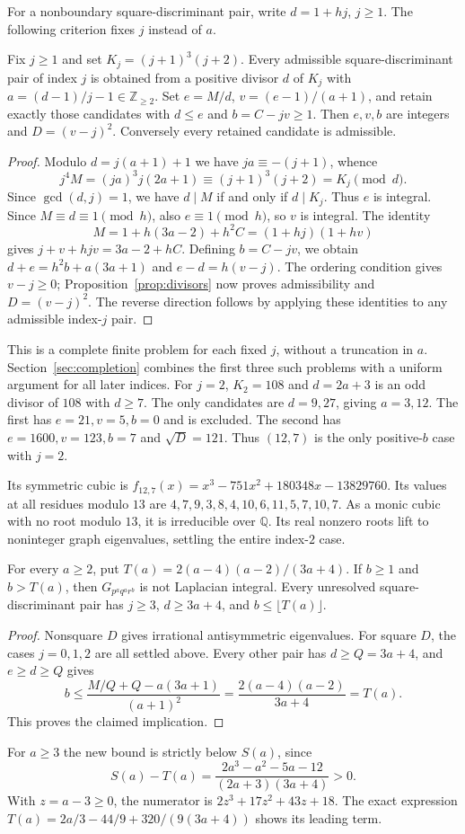 For a nonboundary square-discriminant pair, write $d=1+hj$, $j\geq1$.
The following criterion fixes $j$ instead of $a$.

\begin{proposition}
\label{prop:index}
Fix $j\geq1$ and set $K_j=(j+1)^3(j+2)$.
Every admissible square-discriminant pair of index $j$ is obtained from
a positive divisor $d$ of $K_j$ with
$a=(d-1)/j-1\in\mathbb Z_{\geq2}$.
Set $e=M/d$, $v=(e-1)/(a+1)$, and retain exactly those candidates with
$d\leq e$ and $b=C-jv\geq1$. Then $e,v,b$ are integers and
$D=(v-j)^2$. Conversely every retained candidate is admissible.
\end{proposition}
\begin{proof}
Modulo $d=j(a+1)+1$ we have $ja\equiv-(j+1)$, whence
\[
j^4M=(ja)^3j(2a+1)\equiv(j+1)^3(j+2)=K_j\pmod d.
\]
Since $\gcd(d,j)=1$, we have $d\mid M$ if and only if $d\mid K_j$.
Thus $e$ is integral. Since $M\equiv d\equiv1\pmod h$, also
$e\equiv1\pmod h$, so $v$ is integral. The identity
\[
M=1+h(3a-2)+h^2C=(1+hj)(1+hv)
\]
gives $j+v+h jv=3a-2+hC$. Defining $b=C-jv$, we obtain
$d+e=h^2b+a(3a+1)$ and $e-d=h(v-j)$.
The ordering condition gives $v-j\geq0$; Proposition~\ref{prop:divisors}
now proves admissibility and $D=(v-j)^2$. The reverse direction follows
by applying these identities to any admissible index-$j$ pair.
\end{proof}

This is a complete finite problem for each fixed $j$, without a
truncation in $a$. Section~\ref{sec:completion} combines the first
three such problems with a uniform argument for all later indices.
For $j=2$, $K_2=108$ and $d=2a+3$ is an odd divisor of $108$ with
$d\geq7$. The only candidates are $d=9,27$, giving $a=3,12$.
The first has $e=21,v=5,b=0$ and is excluded. The second has
$e=1600,v=123,b=7$ and $\sqrt D=121$.
Thus $(12,7)$ is the only positive-$b$ case with $j=2$.

Its symmetric cubic is $f_{12,7}(x)=x^3-751x^2+180348x-13829760$.
Its values at all residues modulo $13$ are
$4,7,9,3,8,4,10,6,11,5,7,10,7$.
As a monic cubic with no root modulo $13$, it is irreducible over
$\mathbb Q$. Its real nonzero roots lift to noninteger graph eigenvalues,
settling the entire index-$2$ case.

\begin{theorem}
\label{thm:third}
For every $a\geq2$, put $T(a)=2(a-4)(a-2)/(3a+4)$.
If $b\geq1$ and $b>T(a)$, then $G_{p^a q^a r^b}$ is not Laplacian
integral. Every unresolved square-discriminant pair has $j\geq3$,
$d\geq3a+4$, and $b\leq\lfloor T(a)\rfloor$.
\end{theorem}
\begin{proof}
Nonsquare $D$ gives irrational antisymmetric eigenvalues.
For square $D$, the cases $j=0,1,2$ are all settled above.
Every other pair has $d\geq Q=3a+4$, and $e\geq d\geq Q$ gives
\[
b\leq\frac{M/Q+Q-a(3a+1)}{(a+1)^2}
=\frac{2(a-4)(a-2)}{3a+4}=T(a).
\]
This proves the claimed implication.
\end{proof}

For $a\geq3$ the new bound is strictly below $S(a)$, since
\[
S(a)-T(a)=\frac{2a^3-a^2-5a-12}{(2a+3)(3a+4)}>0.
\]
With $z=a-3\geq0$, the numerator is $2z^3+17z^2+43z+18$.
The exact expression
$T(a)=2a/3-44/9+320/(9(3a+4))$ shows its leading term.
